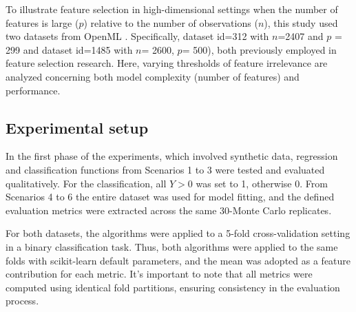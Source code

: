 To illustrate feature selection in high-dimensional settings when the number of features is large (\(p\)) relative to the number of observations (\(n\)), this study used two datasets from OpenML \cite{Vanschoren2014OpenML}. Specifically, dataset id=312 with \(n\)=2407 and \(p\) = 299 and dataset id=1485 with \(n\)= 2600, \(p\)= 500), both previously employed in feature selection research. Here, varying thresholds of feature irrelevance are analyzed concerning both model complexity (number of features) and performance.





\subsection{Experimental setup}

In the first phase of the experiments, which involved synthetic data,  regression and classification functions from Scenarios 1 to 3 were tested and evaluated qualitatively. For the classification, all \(Y>0\) was set to 1, otherwise 0. From Scenarios 4 to 6 the entire dataset was used for model fitting, and the defined evaluation metrics were extracted across the same 30-Monte Carlo replicates. 

For both datasets, the algorithms were applied to a 5-fold cross-validation setting in a binary classification task. Thus, both algorithms were applied to the same folds with scikit-learn default parameters, and the mean was adopted as a feature contribution for each metric. It's important to note that all metrics were computed using identical fold partitions, ensuring consistency in the evaluation process.